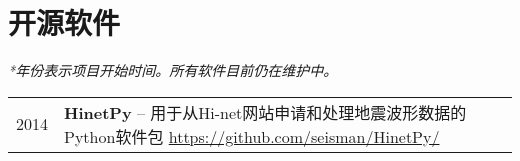\section{开源软件}

\textit{*年份表示项目开始时间。所有软件目前仍在维护中。}

\begin{tabular}{p{} p{}}
2014 & \textbf{HinetPy} -- 用于从Hi-net网站申请和处理地震波形数据的Python软件包 \newline
       \url{https://github.com/seisman/HinetPy/} \\
\end{tabular}
